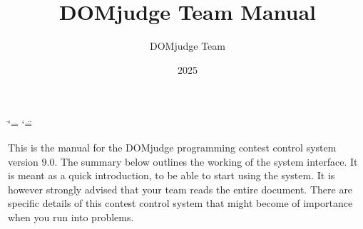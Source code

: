 \documentclass[a4paper,10pt,english,openany]{sphinxmanual}
\title{DOMjudge Team Manual}
\date{2025}
\author{DOMjudge Team}
\begin{document}
\ifdefined\shorthandoff
  \ifnum\catcode`\=\string=\active\shorthandoff{=}\fi
  \ifnum\catcode`\"=\active{}\fi
\fi

\pagestyle{empty}

\pagestyle{plain}

\pagestyle{normal}
\label{\detokenize{team::doc}}



\sphinxAtStartPar
This is the manual for the DOMjudge programming contest control system
version 9.0.
The summary below outlines the working of the system interface. It
is meant as a quick introduction, to be able to start using the system.
It is however strongly advised that your team reads the entire document.
There are specific details of this contest control system that might
become of importance when you run into problems.
\end{document}
